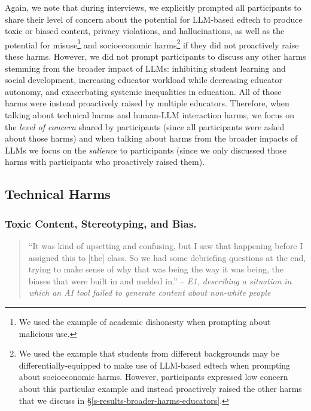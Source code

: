 Again, we note that during interviews, we explicitly prompted all participants to share their level of concern about the potential for LLM-based edtech to produce toxic or biased content, privacy violations, and hallucinations, as well as the potential for misuse\footnote{We used the example of academic dishonesty when prompting about malicious use.} and socioeconomic harms\footnote{We used the example that students from different backgrounds may be differentially-equipped to make use of LLM-based edtech when prompting about socioeconomic harms. However, participants expressed low concern about this particular example and instead proactively raised the other harms that we discuss in \S\ref{s-results-broader-harms-educators}.} if they did not proactively raise these harms. However, we did not prompt participants to discuss any other harms stemming from the broader impact of LLMs: inhibiting student learning and social development, increasing educator workload while decreasing educator autonomy, and exacerbating systemic inequalities in education. All of those harms were instead proactively raised by multiple educators. Therefore, when talking about technical harms and human-LLM interaction harms, we focus on the \textit{level of concern} shared by participants (since all participants were asked about those harms) and when talking about harms from the broader impacts of LLMs we focus on the \textit{salience} to participants (since we only discussed those harms with participants who proactively raised them).



\subsection{Technical Harms}\label{s-results-technical-harms-educators}

\subsubsection*{Toxic Content, Stereotyping, and Bias.}

\begin{quote}
``It was kind of upsetting and confusing, but I saw that happening before I assigned this to [the] class. So we had some debriefing questions at the end, trying to make sense of why that was being the way it was being, the biases that were built in and melded in.'' -- \textit{E1, describing a situation in which an AI tool failed to generate content about non-white people}
\end{quote}


